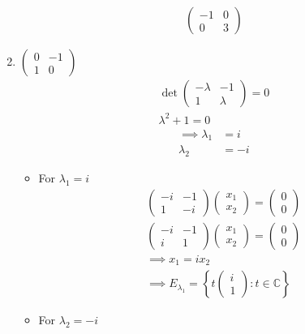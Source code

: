 \begin{enumerate}
\begin{gather}
\begin{pmatrix}
-1 & 0\\
0 & 3
\end{pmatrix}
\end{gather}
\item $\begin{pmatrix} 0 & -1\\1 & 0\end{pmatrix}$
\begin{gather}
\det{
\begin{pmatrix}
-\lambda & -1\\
1 & \lambda
\end{pmatrix}
} = 0\\
\lambda^2 +1 =0  
\end{gather}
\begin{align}
\implies \lambda_1 &= i\\
\lambda_2 &= -i
\end{align}
\begin{itemize}
\item For $\lambda_1 = i$
\begin{gather}
\begin{pmatrix}
-i & -1 \\
1 & -i
\end{pmatrix}
\begin{pmatrix}
x_1\\x_2
\end{pmatrix}
=
\begin{pmatrix}
0\\0
\end{pmatrix}\\
\begin{pmatrix}
-i & -1\\
i & 1
\end{pmatrix}
\begin{pmatrix}
x_1\\x_2
\end{pmatrix}
=
\begin{pmatrix}
0\\0
\end{pmatrix}\\
\implies x_1 = ix_2\\
\implies E_{\lambda_1} = \left\{
t\begin{pmatrix}i\\1\end{pmatrix}\colon t \in \mathbb{C}
\right\}
\end{gather}
\item For $\lambda_2 = -i$
\begin{gather}

\end{gather}
\end{itemize}
\end{enumerate}
